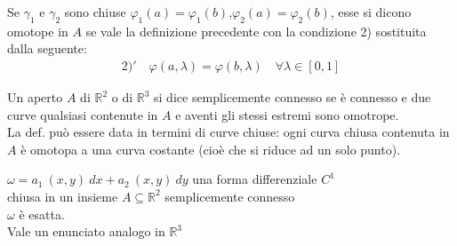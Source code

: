 \documentclass[a4paper, oneside]{article}
\begin{document}
\begin{proposition}
    Se $\gamma_1$ e $\gamma_2$ sono chiuse $\varphi_1(a) = \varphi_1(b)$,$\varphi_2(a) = \varphi_2(b)$, esse si dicono omotope in $A$ se vale la definizione precedente con la condizione 2) sostituita dalla seguente:
    \begin{gather*}
        2)' \quad \varphi(a,\lambda) = \varphi(b,\lambda) \quad \forall \lambda \in [0,1]
    \end{gather*}
\end{proposition}
\begin{definition}
    Un aperto $A$ di $\mathbb{R}^2$ o di $\mathbb{R}^3$ si dice semplicemente connesso se è connesso e due curve qualsiasi contenute in $A$ e aventi gli stessi estremi sono omotrope.\\
    La def. può essere data in termini di curve chiuse: ogni curva chiusa contenuta in $A$ è omotopa a una curva costante (cioè che si riduce ad un solo punto).
\end{definition}
\begin{theorem}
     $\omega= a_1 \ (x,y) \ dx + a_2 \ (x,y) \ dy$ una forma differenziale $C^1$\\
     chiusa in un insieme $A \subseteq \mathbb{R}^2$ semplicemente connesso\\
     $\omega$ è esatta.\\
    Vale un enunciato analogo in $\mathbb{R}^3$
    \begin{center}
    \end{center}
\end{theorem}
\end{document}
